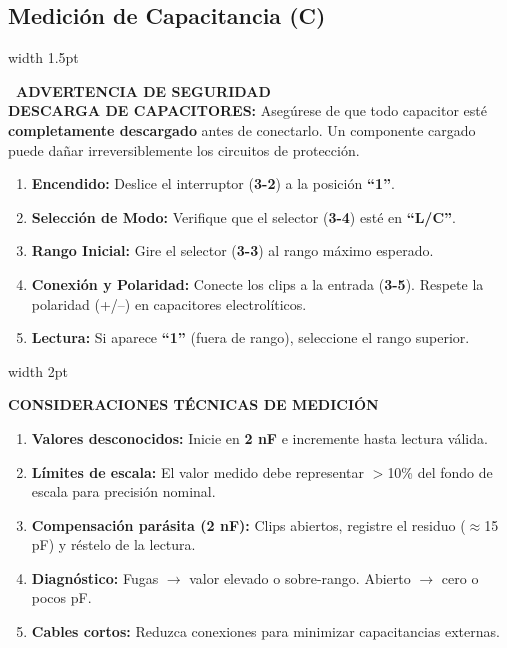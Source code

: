 \documentclass[11pt]{article}
\newcommand{\notastecnicas}[2]{%
    \vspace{6pt}
    \noindent
    \begingroup
    \color{DarkGray}
    \hspace{0.5cm}\vrule width 2pt\hspace{12pt}%
    \begin{minipage}{\dimexpr\textwidth-25pt-0.5cm\relax}
        \vspace{4pt}
        {\small\textbf{#1}}\\[0.15cm]
        \footnotesize #2
        \vspace{4pt}
    \end{minipage}
    \endgroup
    \vspace{6pt}
}
\begin{document}
\subsection{Medición de Capacitancia (C)}

\noindent
\begingroup
\color{red!80!black}
\hspace{0.5cm}\vrule width 1.5pt\hspace{10pt}%
\begin{minipage}{\dimexpr\textwidth-25pt-0.5cm\relax}
    \vspace{3pt}
    {\small\textbf{\faExclamationTriangle\ ADVERTENCIA DE SEGURIDAD}}\\
    \footnotesize\textbf{DESCARGA DE CAPACITORES:} Asegúrese de que todo capacitor esté \textbf{completamente descargado} antes de conectarlo. Un componente cargado puede dañar irreversiblemente los circuitos de protección.
    \vspace{3pt}
\end{minipage}
\endgroup

\vspace{6pt}

\begin{enumerate}[label=\small\color{IndustrialBlue}\bfseries\arabic*., leftmargin=1.4cm, itemsep=5pt]
    \item \textbf{Encendido:} Deslice el interruptor (\textbf{3-2}) a la posición \textbf{``1''}.
    \item \textbf{Selección de Modo:} Verifique que el selector (\textbf{3-4}) esté en \textbf{``L/C''}.
    \item \textbf{Rango Inicial:} Gire el selector (\textbf{3-3}) al rango máximo esperado.
    \item \textbf{Conexión y Polaridad:} Conecte los clips a la entrada (\textbf{3-5}). Respete la polaridad (+/--) en capacitores electrolíticos.
    \item \textbf{Lectura:} Si aparece \textbf{``1''} (fuera de rango), seleccione el rango superior.
\end{enumerate}

\notastecnicas{CONSIDERACIONES TÉCNICAS DE MEDICIÓN}{%
    \begin{enumerate}[leftmargin=0.5cm, labelsep=0.2cm, itemsep=3pt]
        \item \textbf{Valores desconocidos:} Inicie en \textbf{2 nF} e incremente hasta lectura válida.
        \item \textbf{Límites de escala:} El valor medido debe representar $>$10\% del fondo de escala para precisión nominal.
        \item \textbf{Compensación parásita (2 nF):} Clips abiertos, registre el residuo ($\approx$15 pF) y réstelo de la lectura.
        \item \textbf{Diagnóstico:} Fugas $\rightarrow$ valor elevado o sobre-rango. Abierto $\rightarrow$ cero o pocos pF.
        \item \textbf{Cables cortos:} Reduzca conexiones para minimizar capacitancias externas.
    \end{enumerate}
}
\end{document}
